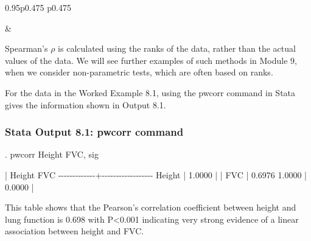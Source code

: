 \documentclass[
]{memoir}
\newenvironment{Shaded}{\begin{snugshade}}{\end{snugshade}}
\newcommand{\NormalTok}[1]{#1}
\begin{document}
\begin{table}[ht]
\begin{centerbox}
\begin{threeparttable}
\begin{tabularx}{0.95\textwidth}{p{} p{}}
\hhline{}

 &
 \tabularnewline[-0.5pt]


\end{tabularx}
\end{threeparttable}\par\end{centerbox}

\end{table}
 

Spearman's \(\rho\) is calculated using the ranks of the data, rather than the actual values of the data. We will see further examples of such methods in Module 9, when we consider non-parametric tests, which are often based on ranks.

For the data in the Worked Example 8.1, using the pwcorr command in Stata gives the information shown in Output 8.1.

\hypertarget{stata-output-8.1-pwcorr-command}{%
\subsubsection{Stata Output 8.1: pwcorr command}\label{stata-output-8.1-pwcorr-command}}

\begin{Shaded}
\begin{Highlighting}[]
\NormalTok{. pwcorr Height FVC, sig}

\NormalTok{             |   Height      FVC}
\NormalTok{{-}{-}{-}{-}{-}{-}{-}{-}{-}{-}{-}{-}{-}+{-}{-}{-}{-}{-}{-}{-}{-}{-}{-}{-}{-}{-}{-}{-}{-}{-}{-}}
\NormalTok{      Height |   1.0000 }
\NormalTok{             |}
\NormalTok{             |}
\NormalTok{         FVC |   0.6976   1.0000 }
\NormalTok{             |   0.0000}
\NormalTok{             |}
\end{Highlighting}
\end{Shaded}

This table shows that the Pearson's correlation coefficient between height and lung function is 0.698 with P\textless0.001 indicating very strong evidence of a linear association between height and FVC.
\end{document}
